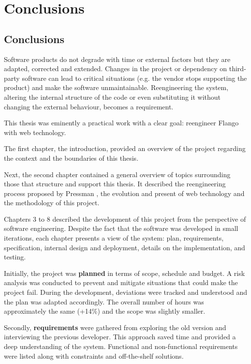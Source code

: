 \chapter{Conclusions}
\section{Conclusions}
Software products do not degrade with time or external factors but they are adapted, corrected and extended.
Changes in the project or dependency on third-party software can lead to critical situations  (e.g. the vendor stops supporting the product) and make the software unmaintainable.
Reengineering the system, altering the internal structure of the code or even substituting it without changing the external behaviour, becomes a requirement.

This thesis was eminently a practical work with a clear goal: reengineer Flango \cm with web technology.

The first chapter, the introduction, provided an overview of the project regarding the context and the boundaries of this thesis.

Next, the second chapter contained a general overview of topics surrounding those that structure and support this thesis.
It described the reengineering process proposed by Pressman \cite{Pressman:2007}, the evolution and present of web technology and the methodology of this project.

Chapters 3 to 8 described the development of this project from the perspective of software engineering.
Despite the fact that the software was developed in small iterations, each chapter presents a view of the system: plan, requirements, specification, internal design and deployment, details on the implementation, and testing.

Initially, the project was \textbf{planned} in terms of scope, schedule and budget. 
A risk analysis was conducted to prevent and mitigate situations that could make the project fail.
During the development, deviations were tracked and understood and the plan was adapted accordingly.
The overall number of hours was approximately the same (+14\%) and the scope was slightly smaller.

Secondly, \textbf{requirements} were gathered from exploring the old version and interviewing the previous developer.
This approach saved time and provided a deep understanding of the system.
Functional and non-functional requirements were listed along with constraints and off-the-shelf solutions.

